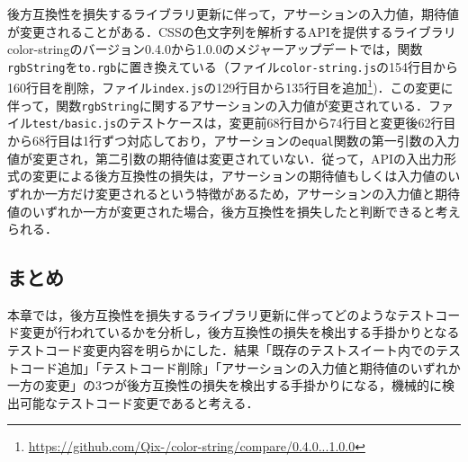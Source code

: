 \documentclass[submit]{ipsj}
\newcommand{\todo}[1]{\colorbox{yellow}{{\bf TODO}:}{\color{red} {\textbf{[#1]}}}}
\begin{document}
{%

後方互換性を損失するライブラリ更新に伴って，アサーションの入力値，期待値が変更されることがある．CSSの色文字列を解析するAPIを提供するライブラリcolor-stringのバージョン0.4.0から1.0.0のメジャーアップデートでは，関数{\verb|rgbString|}を{\verb|to.rgb|}に置き換えている（ファイル\verb|color-string.js|の154行目から160行目を削除，ファイル\verb|index.js|の129行目から135行目を追加\footnote{\url{https://github.com/Qix-/color-string/compare/0.4.0...1.0.0}})．この変更に伴って，関数{\verb|rgbString|}に関するアサーションの入力値が変更されている．ファイル\verb|test/basic.js|のテストケース\footnotemark[15]は，変更前68行目から74行目と変更後62行目から68行目は1行ずつ対応しており，アサーションの{\verb|equal|}関数の第一引数の入力値が変更され，第二引数の期待値は変更されていない．従って，APIの入出力形式の変更による後方互換性の損失は，アサーションの期待値もしくは入力値のいずれか一方だけ変更されるという特徴があるため，アサーションの入力値と期待値のいずれか一方が変更された場合，後方互換性を損失したと判断できると考えられる．

\vspace{-2mm}
\subsection{まとめ}
本章では，後方互換性を損失するライブラリ更新に伴ってどのようなテストコード変更が行われているかを分析し，後方互換性の損失を検出する手掛かりとなるテストコード変更内容を明らかにした．結果「既存のテストスイート内でのテストコード追加」「テストコード削除」「アサーションの入力値と期待値のいずれか一方の変更」の3つが後方互換性の損失を検出する手掛かりになる，機械的に検出可能なテストコード変更であると考える．

}
\end{document}
